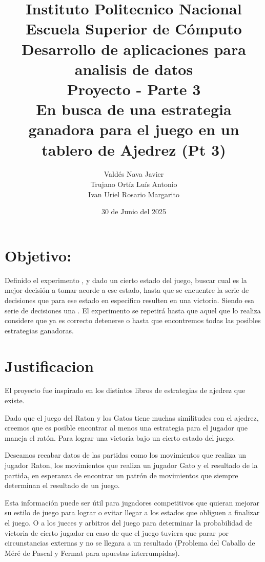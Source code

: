 \documentclass[12pt, Tahoma]{article}
\begin{document}
	\title{
		Instituto Politecnico Nacional\\
		Escuela Superior de Cómputo\\
		Desarrollo de aplicaciones para analisis de datos\\
		\vspace{1cm}
			\textbf{Proyecto - Parte 3}\\
			\textbf{En busca de una estrategia ganadora para el juego  en un tablero de Ajedrez (Pt 3)}
	}
	\author{
		Valdés Nava Javier\\
		Trujano Ortíz Luís Antonio\\
		Ivan Uriel Rosario Margarito
	}
	\date{30 de Junio del 2025}
	\maketitle
	\section*{Objetivo:} Definido el experimento , y dado un cierto estado del juego, buscar cual es la mejor decisión a tomar acorde a ese estado, hasta que se encuentre la serie de decisiones que para ese estado en especifico resulten en una victoria. Siendo esa serie de decisiones una . El experimento se repetirá hasta que aquel que lo realiza considere que ya es correcto detenerse o hasta que encontremos todas las posibles estrategias ganadoras.
	\section*{Justificacion} El proyecto fue inspirado en los distintos libros de estrategias de ajedrez que existe.
	 
	 
	Dado que el juego del Raton y los Gatos tiene muchas similitudes con el ajedrez, creemos que es posible encontrar al menos una estrategia para el jugador que maneja el ratón. Para lograr una victoria bajo un cierto estado del juego.
	
	
	Deseamos recabar datos de las partidas como los movimientos que realiza un jugador Raton, los movimientos que realiza un jugador Gato y el resultado de la partida, en esperanza de encontrar un patrón de movimientos que siempre determinan el resultado de un juego.
	
	
	Esta información puede ser útil para jugadores competitivos que quieran mejorar su estilo de juego para lograr o evitar llegar a los estados que obliguen a finalizar el juego. O a los jueces y arbitros del juego para determinar la probabilidad de victoria de cierto jugador en caso de que el juego tuviera que parar por circunstancias externas y no se llegara a un resultado (Problema del Caballo de Méré de Pascal y Fermat para apuestas interrumpidas).
	 
\end{document}

